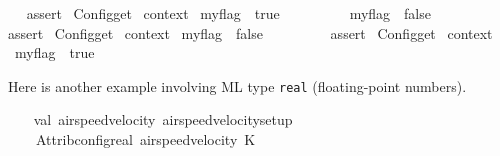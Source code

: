 \begin{isabellebody}
\ {\isacharverbatimopen}\ %
\isaantiq
assert%
\endisaantiq
\ {\isacharparenleft}Config{\isachardot}get\ %
\isaantiq
context%
\endisaantiq
\ my{\isacharunderscore}flag\ {\isacharequal}\ true{\isacharparenright}\ {\isacharverbatimclose}%
\endisatagML
{\isafoldML}%
%
\isadelimML
\isanewline
%
\endisadelimML
\isanewline
{}\isamarkupfalse%
\isanewline
%
\isadelimproof
\ \ %
\endisadelimproof
%
\isatagproof
\isacommand{{\isacharbraceleft}}\isamarkupfalse%
\isanewline
\ \ \ \ \isamarkupfalse%
\ {\isacharbrackleft}{\isacharbrackleft}my{\isacharunderscore}flag\ {\isacharequal}\ false{\isacharbrackright}{\isacharbrackright}%
\endisatagproof
{\isafoldproof}%
%
\isadelimproof
\isanewline
%
\endisadelimproof
%
\isadelimML
\ \ \ \ %
\endisadelimML
%
\isatagML
{}\isamarkupfalse%
\ {\isacharverbatimopen}\ %
\isaantiq
assert%
\endisaantiq
\ {\isacharparenleft}Config{\isachardot}get\ %
\isaantiq
context%
\endisaantiq
\ my{\isacharunderscore}flag\ {\isacharequal}\ false{\isacharparenright}\ {\isacharverbatimclose}%
\endisatagML
{\isafoldML}%
%
\isadelimML
\isanewline
%
\endisadelimML
%
\isadelimproof
\ \ %
\endisadelimproof
%
\isatagproof
\isacommand{{\isacharbraceright}}\isamarkupfalse%
%
\endisatagproof
{\isafoldproof}%
%
\isadelimproof
\isanewline
%
\endisadelimproof
%
\isadelimML
\ \ %
\endisadelimML
%
\isatagML
{}\isamarkupfalse%
\ {\isacharverbatimopen}\ %
\isaantiq
assert%
\endisaantiq
\ {\isacharparenleft}Config{\isachardot}get\ %
\isaantiq
context%
\endisaantiq
\ my{\isacharunderscore}flag\ {\isacharequal}\ true{\isacharparenright}\ {\isacharverbatimclose}%
\endisatagML
{\isafoldML}%
%
\isadelimML
\isanewline
%
\endisadelimML
%
\isadelimproof
%
\endisadelimproof
%
\isatagproof
{}\isamarkupfalse%
%
\endisatagproof
{\isafoldproof}%
%
\isadelimproof
%
\endisadelimproof
%
\begin{isamarkuptext}%
Here is another example involving ML type \verb|real|
  (floating-point numbers).%
\end{isamarkuptext}%
\isamarkuptrue%
%
\isadelimML
%
\endisadelimML
%
\isatagML
{}\isamarkupfalse%
\ {\isacharverbatimopen}\isanewline
\ \ val\ {\isacharparenleft}airspeed{\isacharunderscore}velocity{\isacharcomma}\ airspeed{\isacharunderscore}velocity{\isacharunderscore}setup{\isacharparenright}\ {\isacharequal}\isanewline
\ \ \ \ Attrib{\isachardot}config{\isacharunderscore}real\ {\isachardoublequote}airspeed{\isacharunderscore}velocity{\isachardoublequote}\ {\isacharparenleft}K\ {}{\isachardot}{}{\isacharparenright}\isanewline

\end{isabellebody}

